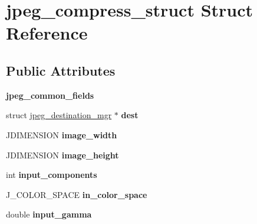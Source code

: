 \hypertarget{structjpeg__compress__struct}{\section{jpeg\-\_\-compress\-\_\-struct Struct Reference}
\label{structjpeg__compress__struct}
}
\subsection*{Public Attributes}
\begin{DoxyCompactItemize}
\item 
\hypertarget{structjpeg__compress__struct_a831013770bec36f77dd2048c8771513c}{{\bfseries jpeg\-\_\-common\-\_\-fields}}\label{structjpeg__compress__struct_a831013770bec36f77dd2048c8771513c}

\item 
\hypertarget{structjpeg__compress__struct_a48a68dee396984116b93a8df1c698248}{struct \hyperlink{structjpeg__destination__mgr}{jpeg\-\_\-destination\-\_\-mgr} $\ast$ {\bfseries dest}}\label{structjpeg__compress__struct_a48a68dee396984116b93a8df1c698248}

\item 
\hypertarget{structjpeg__compress__struct_ac8e50a2c70252c53f3e10b886818f2cf}{J\-D\-I\-M\-E\-N\-S\-I\-O\-N {\bfseries image\-\_\-width}}\label{structjpeg__compress__struct_ac8e50a2c70252c53f3e10b886818f2cf}

\item 
\hypertarget{structjpeg__compress__struct_a30863835e7785b7df800811f842b2da0}{J\-D\-I\-M\-E\-N\-S\-I\-O\-N {\bfseries image\-\_\-height}}\label{structjpeg__compress__struct_a30863835e7785b7df800811f842b2da0}

\item 
\hypertarget{structjpeg__compress__struct_af5b66b039ea5a96bb2f5cf0254115837}{int {\bfseries input\-\_\-components}}\label{structjpeg__compress__struct_af5b66b039ea5a96bb2f5cf0254115837}

\item 
\hypertarget{structjpeg__compress__struct_ac27d1dfbbbd677aab9fb570c58ca960d}{J\-\_\-\-C\-O\-L\-O\-R\-\_\-\-S\-P\-A\-C\-E {\bfseries in\-\_\-color\-\_\-space}}\label{structjpeg__compress__struct_ac27d1dfbbbd677aab9fb570c58ca960d}

\item 
\hypertarget{structjpeg__compress__struct_ac5d2e16382ea12fb4e3bd6a69f7831ea}{double {\bfseries input\-\_\-gamma}}\label{structjpeg__compress__struct_ac5d2e16382ea12fb4e3bd6a69f7831ea}


\end{DoxyCompactItemize}
